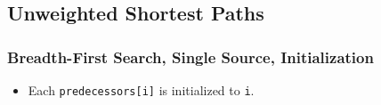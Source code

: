 \begin{comment}
      \subsection{Driver Interface}

      \andrew{I am not sure we should have the unified interface.  We need to be more parsimonious in our interfaces.  Users can read the documentation for which algorithms to use.  And, if they are using graph algorithms, we should assume a certain level of knowledge about graph algorithms.  OTOH, it is only a handful of algorithms.}

      \andrew{I am also not sure we should have ``shortest distance'' variants.  That doubles the number of functions in the interface.
            For each function we have shortest paths, s-t paths, multi-source paths, parallel = 6X variants for each base function.  If we add shortest distances, that will make 12X.  OTOH, we could consider not having s-t paths or not having multi-source paths -- which would leave 4X for each base function.  However, I think people will want s-t and multi-source.
      }
      \phil{\tcode{dijkstra_shortest_distances} includes predecessor and distances, so excluding \tcode{dijkstra_shortest_distances} won't impact 
      the user much.}


      {\small
            
      }

      \andrew{The variety of algorithms was inspired by networkx....  Which also had ``distance'' variants.}

      \phil{I assume \tcode{adjacency_list_graph} is the same as our \tcode{adjacency_list}. \tcode{bidirectional_adjacency_list_graph} is new; what to do with it?}
\end{comment}


\subsection{Unweighted Shortest Paths}

\subsubsection{Breadth-First Search, Single Source, Initialization}

{\small
      
}

\begin{itemdescr}
      \effects
      \begin{itemize}
            \item
                  Each \lstinline{predecessors[i]} is initialized to \lstinline{i}.
      \end{itemize}
\end{itemdescr}


